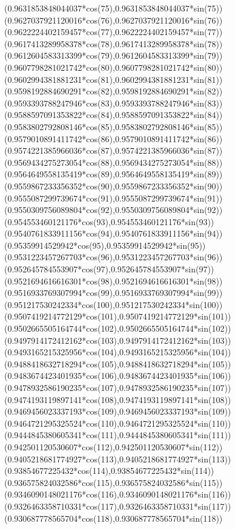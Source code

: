 {({0.9631853848044037*cos(75)},{0.9631853848044037*sin(75)})
({0.9627037921120016*cos(76)},{0.9627037921120016*sin(76)})
({0.9622224402159457*cos(77)},{0.9622224402159457*sin(77)})
({0.9617413289958378*cos(78)},{0.9617413289958378*sin(78)})
({0.9612604583313399*cos(79)},{0.9612604583313399*sin(79)})
({0.9607798281021742*cos(80)},{0.9607798281021742*sin(80)})
({0.9602994381881231*cos(81)},{0.9602994381881231*sin(81)})
({0.9598192884690291*cos(82)},{0.9598192884690291*sin(82)})
({0.9593393788247946*cos(83)},{0.9593393788247946*sin(83)})
({0.9588597091353822*cos(84)},{0.9588597091353822*sin(84)})
({0.9583802792808146*cos(85)},{0.9583802792808146*sin(85)})
({0.9579010891411742*cos(86)},{0.9579010891411742*sin(86)})
({0.9574221385966036*cos(87)},{0.9574221385966036*sin(87)})
({0.9569434275273054*cos(88)},{0.9569434275273054*sin(88)})
({0.9564649558135419*cos(89)},{0.9564649558135419*sin(89)})
({0.9559867233356352*cos(90)},{0.9559867233356352*sin(90)})
({0.9555087299739674*cos(91)},{0.9555087299739674*sin(91)})
({0.9550309756089804*cos(92)},{0.9550309756089804*sin(92)})
({0.954553460121176*cos(93)},{0.954553460121176*sin(93)})
({0.9540761833911156*cos(94)},{0.9540761833911156*sin(94)})
({0.95359914529942*cos(95)},{0.95359914529942*sin(95)})
({0.9531223457267703*cos(96)},{0.9531223457267703*sin(96)})
({0.952645784553907*cos(97)},{0.952645784553907*sin(97)})
({0.9521694616616301*cos(98)},{0.9521694616616301*sin(98)})
({0.9516933769307994*cos(99)},{0.9516933769307994*sin(99)})
({0.951217530242334*cos(100)},{0.951217530242334*sin(100)})
({0.9507419214772129*cos(101)},{0.9507419214772129*sin(101)})
({0.9502665505164744*cos(102)},{0.9502665505164744*sin(102)})
({0.9497914172412162*cos(103)},{0.9497914172412162*sin(103)})
({0.9493165215325956*cos(104)},{0.9493165215325956*sin(104)})
({0.9488418632718294*cos(105)},{0.9488418632718294*sin(105)})
({0.9483674423401935*cos(106)},{0.9483674423401935*sin(106)})
({0.9478932586190235*cos(107)},{0.9478932586190235*sin(107)})
({0.9474193119897141*cos(108)},{0.9474193119897141*sin(108)})
({0.9469456023337193*cos(109)},{0.9469456023337193*sin(109)})
({0.9464721295325524*cos(110)},{0.9464721295325524*sin(110)})
({0.9444845380605341*cos(111)},{0.9444845380605341*sin(111)})
({0.942501120530607*cos(112)},{0.942501120530607*sin(112)})
({0.9405218681774927*cos(113)},{0.9405218681774927*sin(113)})
({0.93854677225432*cos(114)},{0.93854677225432*sin(114)})
({0.936575824032586*cos(115)},{0.936575824032586*sin(115)})
({0.9346090148021176*cos(116)},{0.9346090148021176*sin(116)})
({0.9326463358710331*cos(117)},{0.9326463358710331*sin(117)})
({0.930687778565704*cos(118)},{0.930687778565704*sin(118)})
}
